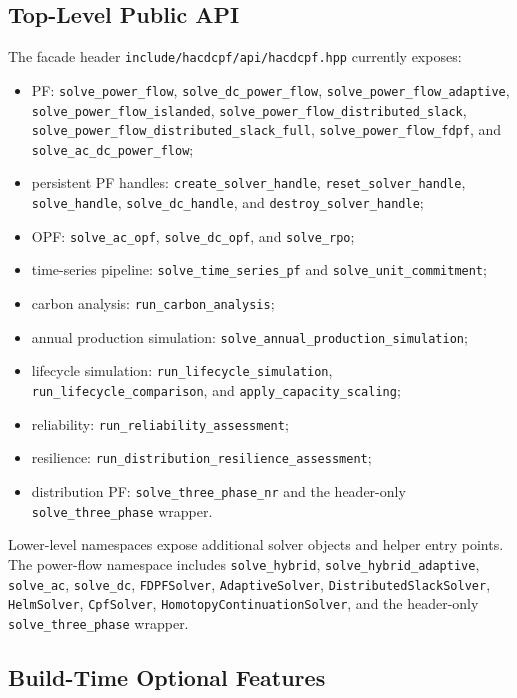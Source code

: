 \subsection{Top-Level Public API}

The facade header \texttt{include/hacdcpf/api/hacdcpf.hpp} currently exposes:
\begin{itemize}
  \item PF: \texttt{solve\_power\_flow}, \texttt{solve\_dc\_power\_flow},
  \texttt{solve\_power\_flow\_adaptive}, \texttt{solve\_power\_flow\_islanded},
  \texttt{solve\_power\_flow\_distributed\_slack},
  \texttt{solve\_power\_flow\_distributed\_slack\_full},
  \texttt{solve\_power\_flow\_fdpf}, and \texttt{solve\_ac\_dc\_power\_flow};
  \item persistent PF handles: \texttt{create\_solver\_handle},
  \texttt{reset\_solver\_handle}, \texttt{solve\_handle},
  \texttt{solve\_dc\_handle}, and \texttt{destroy\_solver\_handle};
  \item OPF: \texttt{solve\_ac\_opf}, \texttt{solve\_dc\_opf}, and
  \texttt{solve\_rpo};
  \item time-series pipeline: \texttt{solve\_time\_series\_pf} and
  \texttt{solve\_unit\_commitment};
  \item carbon analysis: \texttt{run\_carbon\_analysis};
  \item annual production simulation: \texttt{solve\_annual\_production\_simulation};
  \item lifecycle simulation: \texttt{run\_lifecycle\_simulation},
  \texttt{run\_lifecycle\_comparison}, and \texttt{apply\_capacity\_scaling};
  \item reliability: \texttt{run\_reliability\_assessment};
  \item resilience: \texttt{run\_distribution\_resilience\_assessment};
  \item distribution PF: \texttt{solve\_three\_phase\_nr} and the
  header-only \texttt{solve\_three\_phase} wrapper.
\end{itemize}

Lower-level namespaces expose additional solver objects and helper entry
points.  The power-flow namespace includes \texttt{solve\_hybrid},
\texttt{solve\_hybrid\_adaptive}, \texttt{solve\_ac}, \texttt{solve\_dc},
\texttt{FDPFSolver}, \texttt{AdaptiveSolver}, \texttt{DistributedSlackSolver},
\texttt{HelmSolver}, \texttt{CpfSolver}, \texttt{HomotopyContinuationSolver},
and the header-only \texttt{solve\_three\_phase} wrapper.

\subsection{Build-Time Optional Features}

